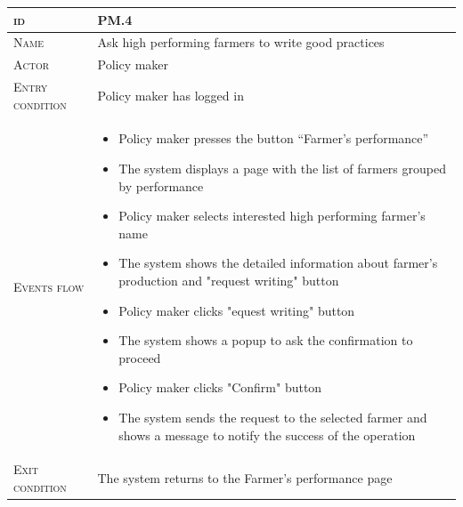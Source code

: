 \begin{table}[H]
    \centering
    \begin{tabular}{|l|p{}|}
        \hline %
    	\textsc{id}                 &   PM.4\\
    	\hline %
    	\textsc{Name}               &   Ask high performing farmers to write good practices\\
    	\hline %
    	\textsc{Actor}             &   Policy maker\\
    	\hline %
    	\textsc{Entry condition}   &   Policy maker has logged in\\
    	\hline %
    	\textsc{Events flow}         &   %
            	                        \begin{itemize}
                                    	    \item Policy maker presses the button “Farmer’s performance”
                                    		\item The system displays a page with the list of farmers grouped by performance
                                    		\item Policy maker selects interested high performing farmer’s name
                                    		\item The system shows the detailed information about farmer’s production and "request writing" button
                                    		\item Policy maker clicks "equest writing" button
                                    		\item The system shows a popup to ask the confirmation to proceed
                                    		\item Policy maker clicks "Confirm" button
                                    		\item The system sends the request to the selected farmer and shows a message to notify the success of the operation
                                        \end{itemize}\\
        \hline %
        \textsc{Exit condition}    &  The system returns to the Farmer’s performance page\\

\end{tabular}
\end{table}
